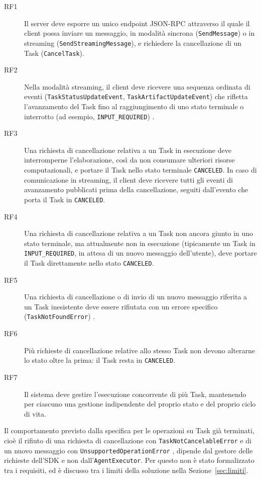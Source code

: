 \begin{description}
    \item[RF1] Il server deve esporre un unico endpoint JSON-RPC attraverso il quale il client possa inviare un messaggio, in modalità sincrona (\texttt{SendMessage}) o in streaming (\texttt{SendStreamingMessage}), e richiedere la cancellazione di un Task (\texttt{CancelTask}).

    \item[RF2] Nella modalità streaming, il client deve ricevere una sequenza ordinata di eventi (\texttt{TaskStatusUpdateEvent}, \texttt{TaskArtifactUpdateEvent}) che rifletta l'avanzamento del Task fino al raggiungimento di uno stato terminale o interrotto (ad esempio, \texttt{INPUT\_REQUIRED}) \cite{a2aspec}.

    \item[RF3] Una richiesta di cancellazione relativa a un Task in esecuzione deve interromperne l'elaborazione, così da non consumare ulteriori risorse computazionali, e portare il Task nello stato terminale \texttt{CANCELED}. In caso di comunicazione in streaming, il client deve ricevere tutti gli eventi di avanzamento pubblicati prima della cancellazione, seguiti dall'evento che porta il Task in \texttt{CANCELED}.

    \item[RF4] Una richiesta di cancellazione relativa a un Task non ancora giunto in uno stato terminale, ma attualmente non in esecuzione (tipicamente un Task in \texttt{INPUT\_REQUIRED}, in attesa di un nuovo messaggio dell'utente), deve portare il Task direttamente nello stato \texttt{CANCELED}.

    \item[RF5] Una richiesta di cancellazione o di invio di un nuovo messaggio riferita a un Task inesistente deve essere rifiutata con un errore specifico (\texttt{TaskNotFoundError}) \cite{a2aspec}.

    \item[RF6] Più richieste di cancellazione relative allo stesso Task non devono alterarne lo stato oltre la prima: il Task resta in \texttt{CANCELED}.

    \item[RF7] Il sistema deve gestire l'esecuzione concorrente di più Task, mantenendo per ciascuno una gestione indipendente del proprio stato e del proprio ciclo di vita.
\end{description}

Il comportamento previsto dalla specifica per le operazioni su Task già terminati, cioè il rifiuto di una richiesta di cancellazione con \texttt{TaskNotCancelableError} e di un nuovo messaggio con \texttt{UnsupportedOperationError} \cite{a2aspec}, dipende dal gestore delle richieste dell'SDK e non dall'\texttt{AgentExecutor}. Per questo non è stato formalizzato tra i requisiti, ed è discusso tra i limiti della soluzione nella Sezione~\ref{sec:limiti}.


